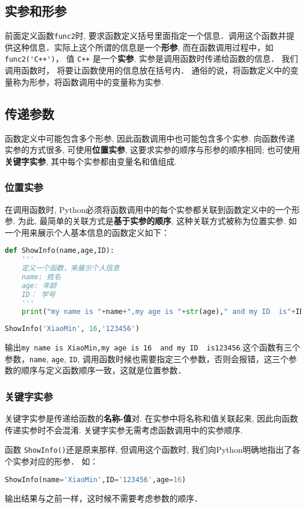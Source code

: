 \subsection{实参和形参}
前面定义函数\verb|func2|时, 要求函数定义括号里面指定一个信息．调用这个函数并提供这种信息．实际上这个所谓的信息是一个\textbf{形参}, 而在函数调用过程中，如\verb|func2('C++')|， 值 \verb|C++| 是一个\textbf{实参}. 实参是调用函数时传递给函数的信息． 我们调用函数时， 将要让函数使用的信息放在括号内． 通俗的说，将函数定义中的变量称为形参，将函数调用中的变量称为实参.

\subsection{传递参数}
函数定义中可能包含多个形参, 因此函数调用中也可能包含多个实参. 向函数传递实参的方式很多, 可使用\textbf{位置实参}, 这要求实参的顺序与形参的顺序相同; 也可使用\textbf{关键字实参}, 其中每个实参都由变量名和值组成.
\subsubsection{位置实参}
在调用函数时, Python必须将函数调用中的每个实参都关联到函数定义中的一个形参. 为此, 最简单的关联方式是\textbf{基于实参的顺序}, 这种关联方式被称为位置实参. 如
一个用来展示个人基本信息的函数定义如下：
\begin{lstlisting}[language=python]
def ShowInfo(name,age,ID):
    '''
    定义一个函数，来展示个人信息
    name: 姓名
    age: 年龄
    ID： 学号
    '''
    print("my name is "+name+",my age is "+str(age)," and my ID  is"+ID)
\end{lstlisting}
\begin{lstlisting}[language=python]
ShowInfo('XiaoMin', 16,'123456')
\end{lstlisting}
输出\verb|my name is XiaoMin,my age is 16  and my ID  is123456|.这个函数有三个参数，\verb|name|, \verb|age|, \verb|ID|, 调用函数时候也需要指定三个参数，否则会报错，这三个参数的顺序与定义函数顺序一致，这就是位置参数．
\subsubsection{关键字实参}
关键字实参是传递给函数的\textbf{名称-值}对. 在实参中将名称和值关联起来, 因此向函数传递实参时不会混淆. 关键字实参无需考虑函数调用中的实参顺序.

函数 \verb|ShowInfo()|还是原来那样, 但调用这个函数时, 我们向Python明确地指出了各个实参对应的形参． 如：
\begin{lstlisting}[language=python]
ShowInfo(name='XiaoMin',ID='123456',age=16)
\end{lstlisting}
输出结果与之前一样，这时候不需要考虑参数的顺序．


